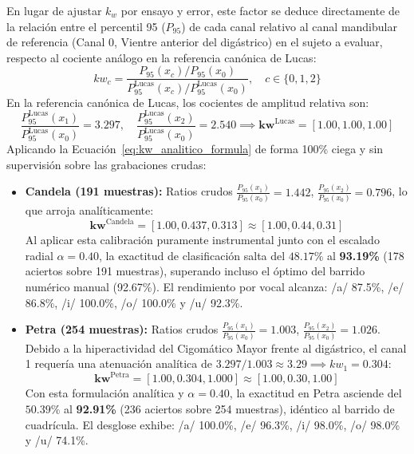 \documentclass[11pt,a4paper,openany]{book}
\theoremstyle{definition}
\begin{document}
En lugar de ajustar $k_w$ por ensayo y error, este factor se deduce directamente de la relación entre el percentil 95 ($P_{95}$) de cada canal relativo al canal mandibular de referencia (Canal 0, Vientre anterior del digástrico) en el sujeto a evaluar, respecto al cociente análogo en la referencia canónica de Lucas:
\begin{equation}
kw_c = \frac{P_{95}(x_c) / P_{95}(x_0)}{P_{95}^{\text{Lucas}}(x_c) / P_{95}^{\text{Lucas}}(x_0)}, \quad c \in \{0, 1, 2\}
\label{eq:kw_analitico_formula}
\end{equation}
En la referencia canónica de Lucas, los cocientes de amplitud relativa son:
\begin{equation}
\frac{P_{95}^{\text{Lucas}}(x_1)}{P_{95}^{\text{Lucas}}(x_0)} = 3.297, \quad \frac{P_{95}^{\text{Lucas}}(x_2)}{P_{95}^{\text{Lucas}}(x_0)} = 2.540 \implies \mathbf{kw}^{\text{Lucas}} = [1.00, 1.00, 1.00]
\end{equation}
Aplicando la Ecuación~\eqref{eq:kw_analitico_formula} de forma 100\% ciega y sin supervisión sobre las grabaciones crudas:
\begin{itemize}
    \item \textbf{Candela (191 muestras):} Ratios crudos $\frac{P_{95}(x_1)}{P_{95}(x_0)} = 1.442$, $\frac{P_{95}(x_2)}{P_{95}(x_0)} = 0.796$, lo que arroja analíticamente:
    \begin{equation}
    \mathbf{kw}^{\text{Candela}} = [1.00, 0.437, 0.313] \approx [1.00, 0.44, 0.31]
    \end{equation}
    Al aplicar esta calibración puramente instrumental junto con el escalado radial $\alpha = 0.40$, la exactitud de clasificación salta del $48.17\%$ al \textbf{93.19\%} (178 aciertos sobre 191 muestras), superando incluso el óptimo del barrido numérico manual (92.67\%). El rendimiento por vocal alcanza: /a/ 87.5\%, /e/ 86.8\%, /i/ 100.0\%, /o/ 100.0\% y /u/ 92.3\%.
    \item \textbf{Petra (254 muestras):} Ratios crudos $\frac{P_{95}(x_1)}{P_{95}(x_0)} = 1.003$, $\frac{P_{95}(x_2)}{P_{95}(x_0)} = 1.026$. Debido a la hiperactividad del Cigomático Mayor frente al digástrico, el canal 1 requería una atenuación analítica de $3.297 / 1.003 \approx 3.29 \implies kw_1 = 0.304$:
    \begin{equation}
    \mathbf{kw}^{\text{Petra}} = [1.00, 0.304, 1.000] \approx [1.00, 0.30, 1.00]
    \end{equation}
    Con esta formulación analítica y $\alpha = 0.40$, la exactitud en Petra asciende del $50.39\%$ al \textbf{92.91\%} (236 aciertos sobre 254 muestras), idéntico al barrido de cuadrícula. El desglose exhibe: /a/ 100.0\%, /e/ 96.3\%, /i/ 98.0\%, /o/ 98.0\% y /u/ 74.1\%.
\end{itemize}
\end{document}
